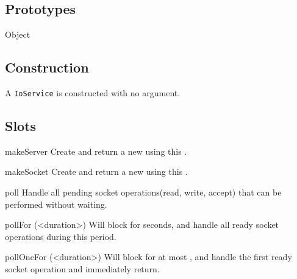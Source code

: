 \subsection{Prototypes}
\begin{refObjects}
\item[Object]
\end{refObjects}

\subsection{Construction}

A \lstinline|IoService| is constructed with no argument.

\subsection{Slots}

\begin{urbiscriptapi}
\item[makeServer]
  Create and return a new  using this .

\item[makeSocket]
  Create and return a new  using this .

\item[poll]
  Handle all pending socket operations(read, write, accept) that can be
  performed without waiting.

\item[pollFor](<duration>)%
  Will block for  seconds, and handle all ready socket operations
  during this period.

\item[pollOneFor](<duration>)%
  Will block for at most , and handle the first ready socket
  operation and immediately return.

\end{urbiscriptapi}

